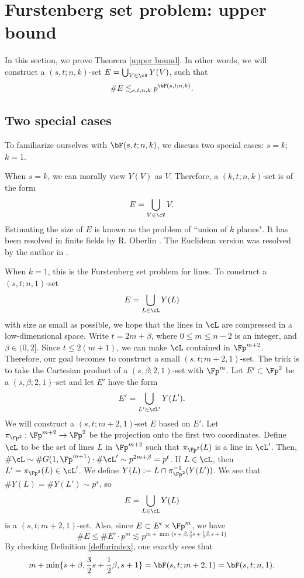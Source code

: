 \section{Furstenberg set problem: upper bound}\label{sec3}

In this section, we prove Theorem \ref{upper bound}. In other words, we will construct a $(s,t;n,k)$-set $E=\bigcup_{V\in\cV}Y(V)$, such that
\[ \#E\lesssim_{s,t,n,k} p^{\bF(s,t;n,k)}.\]
  

\subsection{Two special cases} To familiarize ourselves with $\bF(s,t;n,k)$, we discuss two special cases: $s=k$; $k=1$.

When $s=k$, we can morally view $Y(V)$ as $V$. Therefore, a $(k,t;n,k)$-set is of the form
\[ E=\bigcup_{V\in\cV}V. \]
Estimating the size of $E$ is known as the problem of ``union of $k$ planes". It has been resolved in finite fields by R. Oberlin \cite{oberlin2016unions}. The Euclidean version was resolved by the author in \cite{gan2023hausdorff}.

When $k=1$, this is the Furstenberg set problem for lines. To construct a $(s,t;n,1)$-set 
\[ E=\bigcup_{L\in\cL}Y(L) \]
with size as small as possible, we hope that the lines in $\cL$ are compressed in a low-dimensional space. 
Write $t=2m+\beta$, where $0\le m\le n-2$ is an integer, and $\beta\in (0,2]$. Since $t\le 2(m+1)$, we can make $\cL$ contained in $\Fp^{m+2}$. Therefore, our goal becomes to construct a small $(s,t;m+2,1)$-set. The trick is to take the Cartesian product of a $(s,\beta;2,1)$-set with $\Fp^m$. Let $E'\subset \Fp^2$ be a $(s,\beta;2,1)$-set and let $E'$ have the form
\[ E'=\bigcup_{L'\in \cL'}Y(L'). \]
We will construct a $(s,t;m+2,1)$-set $E$ based on $E'$. Let $\pi_{\Fp^2}:\Fp^{m+2}\rightarrow \Fp^2$ be the projection onto the first two coordinates. Define $\cL$ to be the set of lines $L$ in $\Fp^{m+2}$ such that $\pi_{\Fp^2}(L)$ is a line in $\cL'$. Then, $\#\cL\sim \# G(1,\Fp^{m+1})\cdot \#\cL'\sim p^{2m+\beta}=p^t$. If $L\in \cL$, then $L'=\pi_{\Fp^2}(L)\in \cL'$. We define $Y(L):=L\cap \pi_{\Fp^2}^{-1}(Y(L'))$. We see that $\#Y(L)=\#Y(L')\sim p^s$, so 
\[ E=\bigcup_{L\in\cL}Y(L) \]
is a $(s,t;m+2,1)$-set.
Also, since $E\subset E'\times \Fp^m$, we have
\[ \#E\le\#E'\cdot p^m\lesssim p^{m+\min\{s+\beta,\frac32s+\frac12\beta,s+1\}}  \]
By checking Definition \ref{deffurindex}, one exactly sees that
    \[ m+\min\{s+\beta,\frac32s+\frac12\beta,s+1\}=\bF(s,t;m+2,1)=\bF(s,t;n,1). \]

